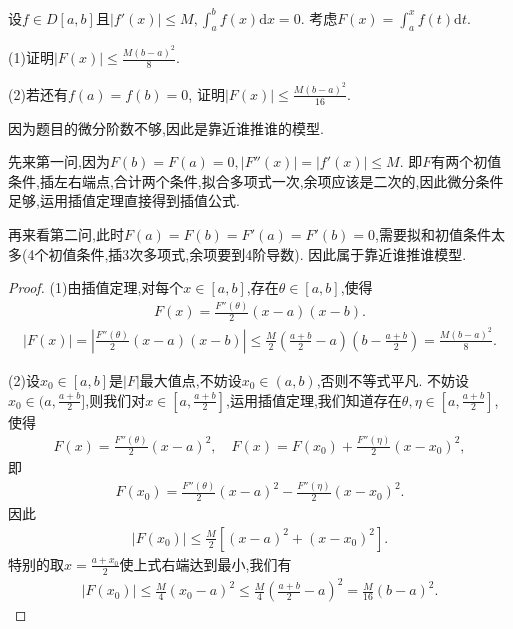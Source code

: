 \documentclass[../../main.tex]{subfiles}%
\begin{document}
\begin{example}
设$f \in D[a,b]$且$|f'(x)| \leqslant M, \int_a^b f(x)\mathrm{d}x = 0$. 考虑$F(x) = \int_a^x f(t)\mathrm{d}t$. 

(1)证明$|F(x)| \leqslant \frac{M(b-a)^2}{8}$. 

(2)若还有$f(a) = f(b) = 0$, 证明$|F(x)| \leqslant \frac{M(b-a)^2}{16}$.
\end{example}
\begin{note}
因为题目的微分阶数不够,因此是靠近谁推谁的模型.

先来第一问,因为$F(b) = F(a) = 0, |F''(x)| = |f'(x)| \leqslant M$. 即$F$有两个初值条件,插左右端点,合计两个条件,拟合多项式一次,余项应该是二次的,因此微分条件足够,运用插值定理直接得到插值公式.

再来看第二问,此时$F(a) = F(b) = F'(a) = F'(b) = 0$,需要拟和初值条件太多(4个初值条件,插3次多项式,余项要到4阶导数). 因此属于靠近谁推谁模型.
\end{note}
\begin{proof}
(1)由插值定理,对每个$x \in [a,b]$,存在$\theta \in [a,b]$,使得
\begin{align*}
F(x) = \frac{F''(\theta)}{2}(x-a)(x-b).
\end{align*}
\begin{align*}
|F(x)| = \left| \frac{F''(\theta)}{2}(x-a)(x-b) \right| \leqslant \frac{M}{2} \left( \frac{a+b}{2} - a \right) \left( b - \frac{a+b}{2} \right) = \frac{M(b-a)^2}{8}.
\end{align*}

(2)设$x_0 \in [a,b]$是$|F|$最大值点,不妨设$x_0 \in (a,b)$,否则不等式平凡.
不妨设$x_0 \in (a, \frac{a+b}{2}]$,则我们对$x \in [a, \frac{a+b}{2}]$,运用插值定理,我们知道存在$\theta, \eta \in [a, \frac{a+b}{2}]$,使得
\begin{align*}
F(x) = \frac{F''(\theta)}{2}(x-a)^2, \quad F(x) = F(x_0) + \frac{F''(\eta)}{2}(x-x_0)^2,
\end{align*}
即
\begin{align*}
F(x_0) = \frac{F''(\theta)}{2}(x-a)^2 - \frac{F''(\eta)}{2}(x-x_0)^2.
\end{align*}
因此
\begin{align*}
|F(x_0)| \leqslant \frac{M}{2} \left[ (x-a)^2 + (x-x_0)^2 \right].
\end{align*}
特别的取$x = \frac{a+x_0}{2}$使上式右端达到最小,我们有
\begin{align*}
|F(x_0)| \leqslant \frac{M}{4}(x_0 - a)^2 \leqslant \frac{M}{4} \left( \frac{a+b}{2} - a \right)^2 = \frac{M}{16}(b-a)^2.
\end{align*}
\end{proof}
\end{document}
